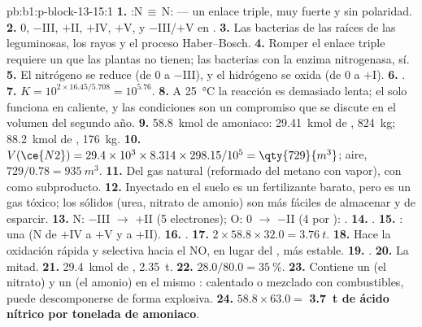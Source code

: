 \begin{solution}{pb:b1:p-block-13-15:1}
\textbf{1.} :N\,$\equiv$\,N: --- un enlace triple, muy fuerte y sin
polaridad.
\textbf{2.} 0, $-$III, $+$II, $+$IV, $+$V, y $-$III/$+$V en .
\textbf{3.} Las bacterias de las raíces de las leguminosas, los rayos y
el proceso Haber--Bosch.
\textbf{4.} Romper el enlace triple requiere un  que las
plantas no tienen; las bacterias con la enzima nitrogenasa, sí.
\textbf{5.} El nitrógeno se reduce (de 0 a $-$III), y el hidrógeno se
oxida (de 0 a $+$I).
\textbf{6.} .
\textbf{7.} $K = 10^{2 \times 16.45/5.708} = 10^{5.76}$.
\textbf{8.} A \qty{25}{\celsius} la reacción es demasiado lenta; el
 solo funciona en caliente, y las condiciones son un
compromiso que se discute en el volumen del segundo año.
\textbf{9.} \qty{58.8}{kmol} de amoniaco: \qty{29.41}{kmol} de ,
\qty{824}{kg}; \qty{88.2}{kmol} de , \qty{176}{kg}.
\textbf{10.} $V(\ce{N2}) = 29.4 \times 10^3 \times 8.314 \times 298.15/10^5 =
\qty{729}{m^3}$; aire, $729/0.78 = \qty{935}{m^3}$.
\textbf{11.} Del gas natural (reformado del metano con vapor), con
 como subproducto.
\textbf{12.} Inyectado en el suelo es un fertilizante barato, pero es un
gas tóxico; los sólidos (urea, nitrato de amonio) son más fáciles de
almacenar y de esparcir.
\textbf{13.} N: $-$III $\to$ $+$II (5 electrones); O: 0 $\to$ $-$II (4 por
): .
\textbf{14.} .
\textbf{15.} : una  (N de $+$IV a
$+$V y a $+$II).
\textbf{16.} .
\textbf{17.} $2 \times 58.8 \times 32.0 = \qty{3.76}{t}$.
\textbf{18.} Hace la oxidación rápida y selectiva hacia el NO, en lugar
del , más estable.
\textbf{19.} .
\textbf{20.} La mitad.
\textbf{21.} \qty{29.4}{kmol} de , \qty{2.35}{t}.
\textbf{22.} $28.0/80.0 = \qty{35}{\percent}$.
\textbf{23.} Contiene un  (el nitrato) y un  (el amonio)
en el mismo : calentado o mezclado con combustibles, puede
descomponerse de forma explosiva.
\textbf{24.} $58.8 \times 63.0 =$ \textbf{\qty{3.7}{t} de ácido nítrico por
tonelada de amoniaco}.
\end{solution}
